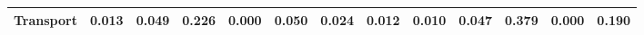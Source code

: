 \begin{table}[htbp]
\begin{tabular}{lcccccccccccc}
  Transport & \textcolor[RGB]{193,125,62}{0.013} & \textcolor[RGB]{101,65,154}{0.049} & \textcolor[RGB]{25,16,230}{0.226} & \textcolor[RGB]{248,160,7}{0.000} & \textcolor[RGB]{97,63,158}{0.050} & \textcolor[RGB]{163,105,92}{0.024} & \textcolor[RGB]{200,129,55}{0.012} & \textcolor[RGB]{205,133,50}{0.010} & \textcolor[RGB]{104,68,151}{0.047} & \textcolor[RGB]{12,8,243}{0.379} & \textcolor[RGB]{250,162,5}{0.000} & \textcolor[RGB]{35,23,220}{0.190} \\ 
   \hline
\end{tabular}
\end{table}
